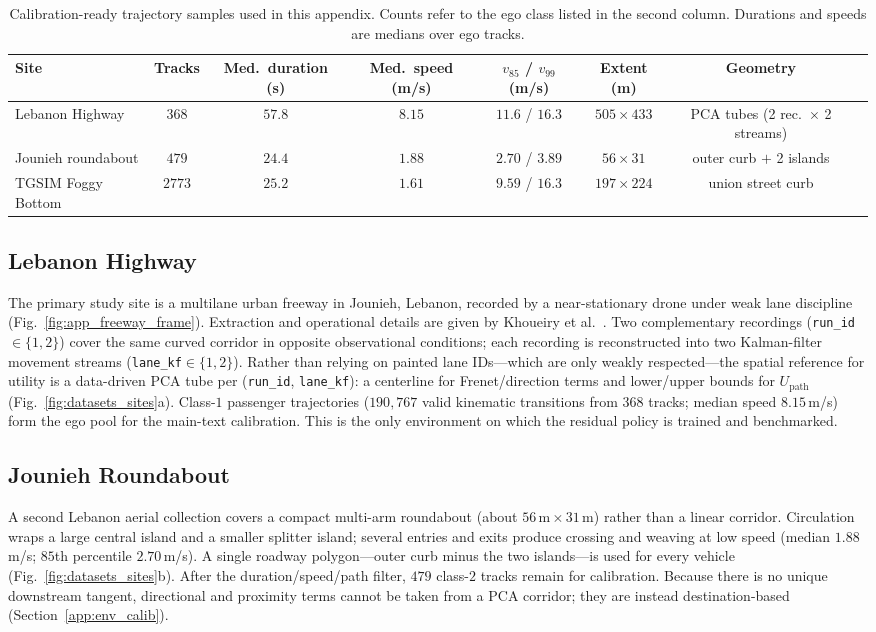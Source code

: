 \documentclass[conference]{IEEEtran}
\begin{document}
\begin{table}[t]
\centering
\caption{Calibration-ready trajectory samples used in this appendix. Counts refer to the ego class listed in the second column. Durations and speeds are medians over ego tracks.}
\label{tab:app_dataset_summary}
\small
\begin{tabular}{lccccccc}
\toprule
Site & Tracks & Med.\ duration (s) & Med.\ speed (m/s) & $v_{85}$ / $v_{99}$ (m/s) & Extent (m) & Geometry \\
\midrule
Lebanon Highway      & $368$  & $57.8$ & $8.15$ & $11.6$ / $16.3$ & $505\times 433$ & PCA tubes (2 rec.\ $\times$ 2 streams) \\
Jounieh roundabout   & $479$  & $24.4$ & $1.88$ & $2.70$ / $3.89$ & $56\times 31$   & outer curb $+$ 2 islands \\
TGSIM Foggy Bottom   & $2773$ & $25.2$ & $1.61$ & $9.59$ / $16.3$ & $197\times 224$ & union street curb \\
\bottomrule
\end{tabular}
\end{table}

\subsection{Lebanon Highway}
The primary study site is a multilane urban freeway in Jounieh, Lebanon, recorded by a near-stationary drone under weak lane discipline (Fig.~\ref{fig:app_freeway_frame}). Extraction and operational details are given by Khoueiry et al.~\cite{khoueiry2025universal}. Two complementary recordings (\texttt{run\_id}$\in\{1,2\}$) cover the same curved corridor in opposite observational conditions; each recording is reconstructed into two Kalman-filter movement streams (\texttt{lane\_kf}$\in\{1,2\}$). Rather than relying on painted lane IDs---which are only weakly respected---the spatial reference for utility is a data-driven PCA tube per (\texttt{run\_id}, \texttt{lane\_kf}): a centerline for Frenet/direction terms and lower/upper bounds for $U_{\mathrm{path}}$ (Fig.~\ref{fig:datasets_sites}a). Class-$1$ passenger trajectories ($190{,}767$ valid kinematic transitions from $368$ tracks; median speed $8.15$\,m/s) form the ego pool for the main-text calibration. This is the only environment on which the residual policy is trained and benchmarked.

\subsection{Jounieh Roundabout}
A second Lebanon aerial collection covers a compact multi-arm roundabout (about $56\,\mathrm{m}\times 31\,\mathrm{m}$) rather than a linear corridor. Circulation wraps a large central island and a smaller splitter island; several entries and exits produce crossing and weaving at low speed (median $1.88$\,m/s; $85$th percentile $2.70$\,m/s). A single roadway polygon---outer curb minus the two islands---is used for every vehicle (Fig.~\ref{fig:datasets_sites}b). After the duration/speed/path filter, $479$ class-$2$ tracks remain for calibration. Because there is no unique downstream tangent, directional and proximity terms cannot be taken from a PCA corridor; they are instead destination-based (Section~\ref{app:env_calib}).
\end{document}

